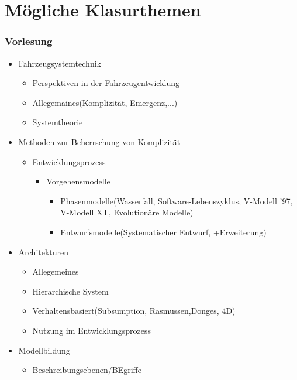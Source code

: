 \part{M\"ogliche Klasurthemen}
\section{Vorlesung}
\begin{itemize}
    \item Fahrzeugsystemtechnik\begin{itemize}
              \item Perspektiven in der Fahrzeugentwicklung
              \item Allegemaines(Komplizit\"at, Emergenz,...)
              \item Systemtheorie
          \end{itemize}
    \item Methoden zur Beherrschung von Komplizit\"at\begin{itemize}
              \item Entwicklungsprozess\begin{itemize}
                        \item Vorgehensmodelle\begin{itemize}
                                  \item Phasenmodelle(Wasserfall, Software-Lebenszyklus, V-Modell '97, V-Modell XT, Evolution\"are Modelle)
                                  \item Entwurfsmodelle(Systematischer Entwurf, +Erweiterung)
                              \end{itemize}
                    \end{itemize}
          \end{itemize}
    \item Architekturen\begin{itemize}
              \item Allegemeines
              \item Hierarchische System
              \item Verhaltensbasiert(Subsumption, Rasmussen,Donges, 4D)
              \item Nutzung im Entwicklungsprozess
          \end{itemize}
    \item Modellbildung\begin{itemize}
              \item Beschreibungsebenen/BEgriffe

\end{itemize}
\end{itemize}
